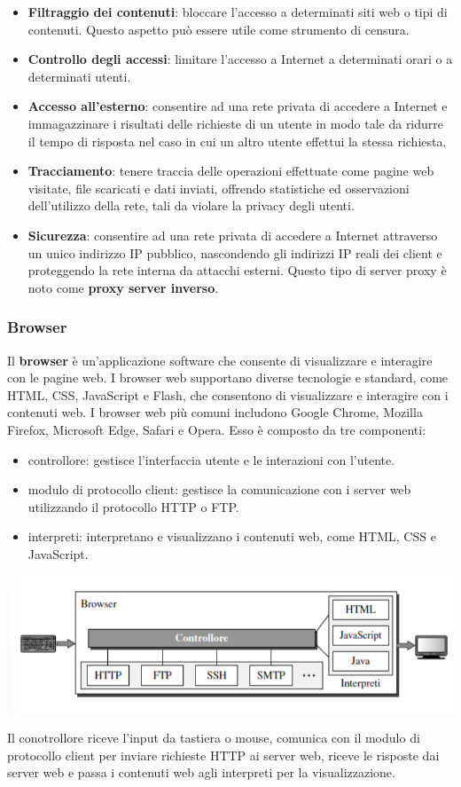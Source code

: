 \documentclass[12pt]{report}
\begin{document}
	\begin{itemize}
		\item \textbf{Filtraggio dei contenuti}: bloccare l'accesso a determinati siti web o tipi di contenuti. Questo aspetto può essere utile come strumento di censura.
		\item \textbf{Controllo degli accessi}: limitare l'accesso a Internet a determinati orari o a determinati utenti.
		\item \textbf{Accesso all'esterno}: consentire ad una rete privata di accedere a Internet e immagazzinare i risultati delle richieste di un utente in modo tale da ridurre il tempo di risposta nel caso in cui un altro utente effettui la stessa richiesta.
		\item \textbf{Tracciamento}: tenere traccia delle operazioni effettuate come pagine web visitate, file scaricati e dati inviati, offrendo statistiche ed osservazioni dell'utilizzo della rete, tali da violare la privacy degli utenti. 
		\item \textbf{Sicurezza}: consentire ad una rete privata di accedere a Internet attraverso un unico indirizzo IP pubblico, nascondendo gli indirizzi IP reali dei client e proteggendo la rete interna da attacchi esterni. Questo tipo di server proxy è noto come \textbf{proxy server inverso}.
	\end{itemize} 

	\subsubsection{Browser}
	Il \textbf{browser} è un'applicazione software che consente di visualizzare e interagire con le pagine web. I browser web supportano diverse tecnologie e standard, come HTML, CSS, JavaScript e Flash, che consentono di visualizzare e interagire con i contenuti web. I browser web più comuni includono Google Chrome, Mozilla Firefox, Microsoft Edge, Safari e Opera. Esso è composto da tre componenti:
	\begin{itemize}
		\item controllore: gestisce l'interfaccia utente e le interazioni con l'utente.
		\item modulo di protocollo client: gestisce la comunicazione con i server web utilizzando il protocollo HTTP o FTP.
		\item interpreti: interpretano e visualizzano i contenuti web, come HTML, CSS e JavaScript.
	\end{itemize}
	\begin{center}
		\includegraphics[scale=0.5]{assets/browser.png}
	\end{center}
	Il conotrollore riceve l'input da tastiera o mouse, comunica con il modulo di protocollo client per inviare richieste HTTP ai server web, riceve le risposte dai server web e passa i contenuti web agli interpreti per la visualizzazione.
\end{document}

